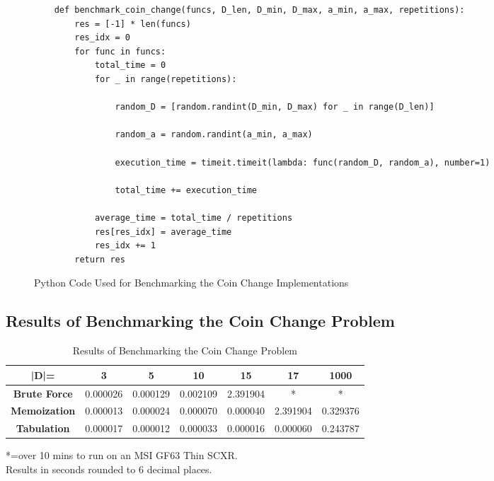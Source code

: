 \begin{figure}[H]
    \centering
    \begin{lstlisting}
    def benchmark_coin_change(funcs, D_len, D_min, D_max, a_min, a_max, repetitions):
        res = [-1] * len(funcs)
        res_idx = 0
        for func in funcs:
            total_time = 0
            for _ in range(repetitions):
    
                random_D = [random.randint(D_min, D_max) for _ in range(D_len)]
    
                random_a = random.randint(a_min, a_max)
                
                execution_time = timeit.timeit(lambda: func(random_D, random_a), number=1)
    
                total_time += execution_time
    
            average_time = total_time / repetitions
            res[res_idx] = average_time
            res_idx += 1
        return res
    \end{lstlisting}
    \caption{Python Code Used for Benchmarking the Coin Change Implementations}
    \label{fig:bm-coin-change}
\end{figure}

\subsection{Results of Benchmarking the Coin Change Problem}
\begin{table}[H]
    \centering
    \begin{tabular}{|c|c|c|c|c|c|c|}
        \hline
        \textbf{|D|=}  & \textbf{3} & \textbf{5} & \textbf{10} & \textbf{15} & \textbf{17}  & \textbf{1000} \\
        \hline
        \textbf{Brute Force} & 0.000026 & 0.000129 & 0.002109 & 2.391904 & * & * \\
        \hline
        \textbf{Memoization} & 0.000013 & 0.000024 & 0.000070 & 0.000040 & 2.391904 & 0.329376 \\
        \hline
        \textbf{Tabulation} & 0.000017 & 0.000012 & 0.000033 & 0.000016 & 0.000060 & 0.243787 \\
        \hline
    \end{tabular}
    \caption{Results of Benchmarking the Coin Change Problem}
\end{table}
*=over 10 mins to run on an MSI GF63 Thin SCXR.\\
Results in seconds rounded to 6 decimal places.


